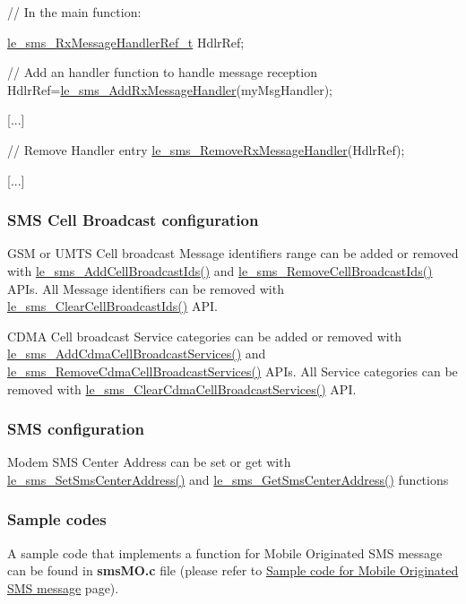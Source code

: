 \begin{DoxyCode}
[...]
\textcolor{comment}{// In the main function:}

\hyperlink{le__sms__interface_8h_a77d2607cc541bf0369e69bb2d105d4bf}{le\_sms\_RxMessageHandlerRef\_t} HdlrRef;

\textcolor{comment}{// Add an handler function to handle message reception}
HdlrRef=\hyperlink{le__sms__interface_8h_a844d595f3ae8d170b2fff80d854abb8d}{le\_sms\_AddRxMessageHandler}(myMsgHandler);

[...]

\textcolor{comment}{// Remove Handler entry}
\hyperlink{le__sms__interface_8h_a2f474706ba6d7a40083fe1f50f530101}{le\_sms\_RemoveRxMessageHandler}(HdlrRef);

[...]
\end{DoxyCode}
\hypertarget{c_sms_le_sms_ops_broadcast_configuration}{}\subsubsection{S\+M\+S Cell Broadcast configuration}\label{c_sms_le_sms_ops_broadcast_configuration}
G\+S\+M or U\+M\+T\+S Cell broadcast Message identifiers range can be added or removed with \hyperlink{le__sms__interface_8h_aae87dacecc438ea9182d370895e5cb3f}{le\+\_\+sms\+\_\+\+Add\+Cell\+Broadcast\+Ids()} and \hyperlink{le__sms__interface_8h_a656fefe815bb965e10087ee65b59faa0}{le\+\_\+sms\+\_\+\+Remove\+Cell\+Broadcast\+Ids()} A\+P\+Is. All Message identifiers can be removed with \hyperlink{le__sms__interface_8h_ae3333cbf700035067f2dae8ea0e564d0}{le\+\_\+sms\+\_\+\+Clear\+Cell\+Broadcast\+Ids()} A\+P\+I.

C\+D\+M\+A Cell broadcast Service categories can be added or removed with \hyperlink{le__sms__interface_8h_ad57196114a634f36b057a9cfbcb7d58a}{le\+\_\+sms\+\_\+\+Add\+Cdma\+Cell\+Broadcast\+Services()} and \hyperlink{le__sms__interface_8h_ae7c58d4ed9ff586d2403232b0cda99e7}{le\+\_\+sms\+\_\+\+Remove\+Cdma\+Cell\+Broadcast\+Services()} A\+P\+Is. All Service categories can be removed with \hyperlink{le__sms__interface_8h_ac737aaab68b6fa1d51a21b518ad112a9}{le\+\_\+sms\+\_\+\+Clear\+Cdma\+Cell\+Broadcast\+Services()} A\+P\+I.\hypertarget{c_sms_le_sms_ops_configuration}{}\subsubsection{S\+M\+S configuration}\label{c_sms_le_sms_ops_configuration}
Modem S\+M\+S Center Address can be set or get with \hyperlink{le__sms__interface_8h_a5df138c515944ce955dd54689593b5df}{le\+\_\+sms\+\_\+\+Set\+Sms\+Center\+Address()} and \hyperlink{le__sms__interface_8h_aeef8f1ac8d2aa3f512e15c054e024bea}{le\+\_\+sms\+\_\+\+Get\+Sms\+Center\+Address()} functions\hypertarget{c_sms_le_sms_ops_samples}{}\subsubsection{Sample codes}\label{c_sms_le_sms_ops_samples}
A sample code that implements a function for Mobile Originated S\+M\+S message can be found in {\bfseries sms\+M\+O.\+c} file (please refer to \hyperlink{c_smsSampleMO}{Sample code for Mobile Originated S\+M\+S message} page).

